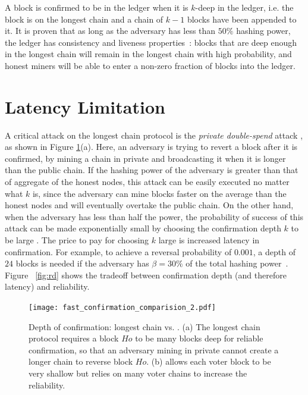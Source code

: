  A block is confirmed to be in the ledger when it is $k$-deep in the ledger, i.e. the block is on the longest chain and a chain of $k-1$ blocks have been appended to it. It is proven that as long as the adversary has less than $50\%$ hashing power, the ledger has consistency and liveness properties~\cite{backbone}: blocks that are deep enough in the longest chain will remain in the longest chain with high probability, and honest miners will be able to enter a non-zero fraction of blocks into the ledger. 



\section{Latency Limitation}
\label{s:lc-latency}
A critical attack on the longest chain protocol is the {\em private  double-spend} attack \cite{bitcoin}, as shown in Figure \ref{fig:double_spend}(a). Here, an adversary is trying to revert a block after it is confirmed, by mining a chain in private and broadcasting it when it is longer than the public chain. If the hashing power of the adversary is greater than that of aggregate of the honest nodes, this attack can be easily executed no matter what $k$ is, since the adversary can mine blocks faster on the average than the honest nodes and will eventually  overtake the public chain. On the other hand, when the adversary has less than half the power, the probability of success of this attack can be made exponentially small by choosing the confirmation depth $k$ to be large \cite{bitcoin}. The price to pay for choosing $k$ large is increased latency in confirmation. For example, to achieve a reversal probability of  $0.001$, a depth of $24$ blocks is needed if the adversary has $\beta = 30\%$ of the total hashing power~\cite{bitcoin}.  Figure ~\ref{fig:rd} shows the tradeoff between confirmation depth (and therefore latency) and reliability.

\begin{figure}
\begin{center}
\texttt{[image: fast\_confirmation\_comparision\_2.pdf]}
\end{center}
    \caption[Depth of confirmation: longest chain vs. Prism.]{Depth of confirmation: longest chain vs. \prism. (a) The longest chain protocol requires a block $Ho$ to be many blocks deep for reliable confirmation, so that an adversary mining in private cannot create a longer chain to reverse block $Ho$. (b) \prism allows each voter block to be very shallow but relies on many voter chains to increase the reliability.}
\label{fig:double_spend}
\end{figure}


